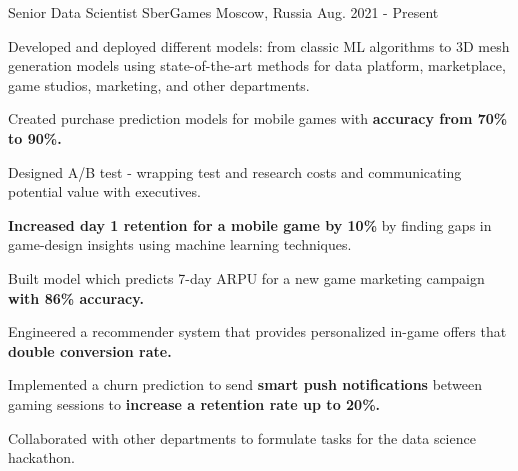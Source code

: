 

\begin{cventries}

  \cventry
    {Senior Data Scientist} %
    {SberGames} %
    {Moscow, Russia} %
    {Aug. 2021 - Present} %
    {
      \begin{cvitems} %
        \item {Developed and deployed different models: from classic ML algorithms to 3D mesh generation models using state-of-the-art methods for data platform, marketplace, game studios, marketing, and other departments.}
        \item {Created purchase prediction models for mobile games with \textbf{accuracy from 70\% to 90\%.}}
        \item {Designed A/B test - wrapping test and research costs and communicating potential value with executives.}
        \item {\textbf{Increased day 1 retention for a mobile game by 10\%} by finding gaps in game-design insights using machine learning techniques.}
        \item {Built model which predicts 7-day ARPU for a new game marketing campaign \textbf{with 86\% accuracy.}}
        \item {Engineered a recommender system that provides personalized in-game offers that \textbf{double conversion rate.}}
        \item {Implemented a churn prediction to send \textbf{smart push notifications} between gaming sessions to \textbf{increase a retention rate up to 20\%.}}
        \item {Collaborated with other departments to formulate tasks for the data science hackathon.}
      \end{cvitems}
    }


\end{cventries}
